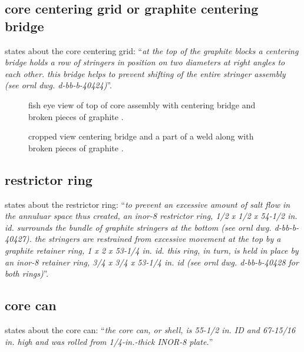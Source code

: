 \documentclass{article}
\newcommand*{\mrsarchive}{../../msr-archive}%
\begin{document}

\subsection{core centering grid or graphite centering bridge}
\parencite[page 84-85]{ornl-tm-0728} states about the core centering grid:
\enquote{\textit{at the top of the graphite blocks a centering bridge holds a row of stringers in position on two diameters at right angles to each other. this bridge helps to prevent shifting of the entire stringer assembly (see ornl dwg. d-bb-b-40424)}}.
\begin{figure}[H]
  \centering
  \centering
  \caption{fish eye view of top of core assembly with centering bridge and broken pieces of graphite \parencite[figure 1.5]{ornl-4676}.}
  \label{4676-fig1-5}
\end{figure}

\begin{figure}[H]
  \centering
  \centering
  \caption{cropped view centering bridge and a part of a weld along with broken pieces of graphite \parencite[figure 1.4]{ornl-4676}.}
  \label{4676-fig1-4}
\end{figure}

\subsection{restrictor ring}
\parencite[page 84-85]{ornl-tm-0728} states about the restrictor ring:
\enquote{\textit{to prevent an excessive amount of salt flow in the annuluar space thus created, an inor-8 restrictor ring, 1/2 x 1/2 x 54-1/2 in. id. surrounds the bundle of graphite stringers at the bottom (see ornl dwg. d-bb-b-40427). the stringers are restrained from excessive movement at the top by a graphite retainer ring, 1 x 2 x 53-1/4 in. id. this ring, in turn, is held in place by an inor-8 retainer ring, 3/4 x 3/4 x 53-1/4 in. id (see ornl dwg. d-bb-b-40428 for both rings)}}.

\subsection{core can}
\parencite[page 79]{ornl-tm-0728} states about the core can:
\enquote{\textit{the core can, or shell, is 55-1/2 in. ID and 67-15/16 in. high and was rolled from 1/4-in.-thick INOR-8 plate.}}
\end{document}
